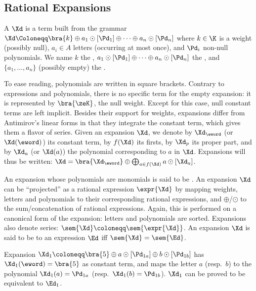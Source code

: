 \documentclass[a4paper,USenglish]{lipics}
\begin{document}
\subsection{Rational Expansions}
\label{sec:expa}



\begin{Definition}
  A  $\Xd$ is a term built from the grammar
  \begin{math}
    \Xd \Coloneqq \bra{k} \oplus a_1 \odot[\Pd_1] \oplus \cdots \oplus a_n \odot[\Pd_n]
  \end{math}
  where $k \in \K$ is a weight (possibly null), $a_i \in A$ letters
  (occurring at most once), and $\Pd_i$ non-null polynomials.  We name $k$
  the ,
  $a_1 \odot[\Pd_1] \oplus \cdots \oplus a_n \odot[\Pd_n]$ the , and $\{a_1, \ldots, a_n\}$ (possibly empty) the .
\end{Definition}
To ease reading, polynomials are written in square brackets.  Contrary to
expressions and polynomials, there is no specific term for the empty
expansion: it is represented by $\bra{\zeK}$, the null weight.  Except for
this case, null constant terms are left implicit.  Besides their support for
weights, expansions differ from Antimirov's linear forms in that they
integrate the constant term, which gives them a flavor of series.  Given an
expansion $\Xd$, we denote by $\Xd_\eword$ (or $\Xd(\eword)$) its constant
term, by $f(\Xd)$ its firsts, by $\Xd_p$ its proper part, and by $\Xd_a$ (or
$\Xd(a)$) the polynomial corresponding to $a$ in $\Xd$.  Expansions will
thus be written:
\begin{math}
  \Xd = \bra{\Xd_{\eword}} \oplus \bigoplus_{a \in f(\Xd)} a \odot[\Xd_a]
\end{math}.



An expansion whose polynomials are monomials is said to be
.  An expansion $\Xd$ can be ``projected'' as a rational
expression $\expr{\Xd}$ by mapping weights, letters and polynomials to their
corresponding rational expressions, and $\oplus$/$\odot$ to the
sum/concatenation of rational expressions.  Again, this is performed on a
canonical form of the expansion: letters and polynomials are sorted.
Expansions also denote series: $\sem{\Xd} \coloneqq \sem{\expr{\Xd}}$.  An
expansion $\Xd$ is said to be  to an expression $\Ed$ iff
$\sem{\Xd} = \sem{\Ed}$.

\begin{Example}
  \label{ex:e1:xpn}
  Expansion
  $\Xd_1 \coloneqq \bra{5} \oplus a \odot [\Pd_{1a}] \oplus b \odot
  [\Pd_{1b}]$
  has $\Xd_1(\eword) = \bra{5}$ as constant term, and maps the letter $a$
  (resp.\ $b$) to the polynomial $\Xd_1(a) = \Pd_{1a}$ (resp.\
  $\Xd_1(b) = \Pd_{1b}$).  $\Xd_1$ can be proved to be equivalent to
  $\Ed_1$.
\end{Example}
\end{document}
